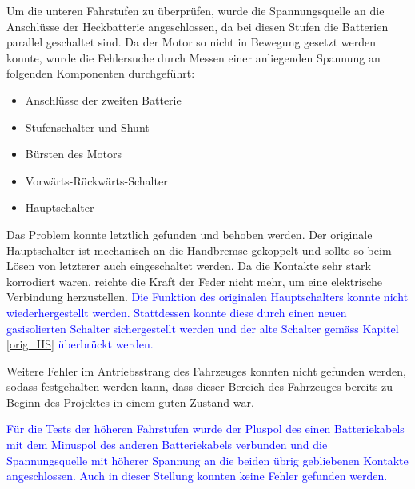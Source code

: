 Um die unteren Fahrstufen zu überprüfen, wurde die Spannungsquelle an die Anschlüsse der Heckbatterie angeschlossen, da bei diesen Stufen die Batterien parallel geschaltet sind. Da der Motor so nicht in Bewegung gesetzt werden konnte, wurde die Fehlersuche durch Messen einer anliegenden Spannung an folgenden Komponenten durchgeführt: \newpage\begin{itemize}
	\item Anschlüsse der zweiten Batterie
	\item Stufenschalter und Shunt
	\item Bürsten des Motors
	\item Vorwärts-Rückwärts-Schalter
	\item Hauptschalter
\end{itemize}

Das Problem konnte letztlich gefunden und behoben werden. Der originale Hauptschalter ist mechanisch an die Handbremse gekoppelt und sollte so beim Lösen von letzterer auch eingeschaltet werden. Da die Kontakte sehr stark korrodiert waren, reichte die Kraft der Feder nicht mehr, um eine elektrische Verbindung herzustellen. \textcolor{blue}{Die Funktion des originalen Hauptschalters konnte nicht wiederhergestellt werden. Stattdessen konnte diese durch einen neuen gasisolierten Schalter sichergestellt werden und der alte Schalter gemäss Kapitel \ref{orig_HS} überbrückt werden.}

Weitere Fehler im Antriebsstrang des Fahrzeuges konnten nicht gefunden werden, sodass festgehalten werden kann, dass dieser Bereich des Fahrzeuges bereits zu Beginn des Projektes in einem guten Zustand war.

\textcolor{blue}{Für die Tests der höheren Fahrstufen wurde der Pluspol des einen Batteriekabels mit dem Minuspol des anderen Batteriekabels verbunden und die Spannungsquelle mit höherer Spannung an die beiden übrig gebliebenen Kontakte angeschlossen. Auch in dieser Stellung konnten keine Fehler gefunden werden.}



\newpage